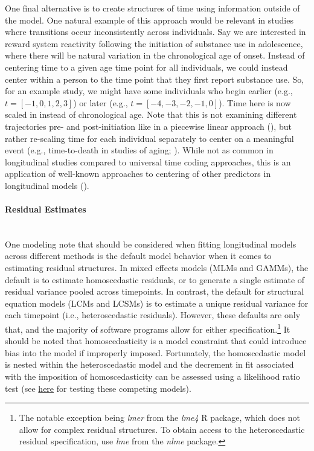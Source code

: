 \documentclass[11pt]{article}
\newcommand{\subsubsubsection}[1]{\paragraph{#1}\mbox{}\\}  %
\begin{document}
One final alternative is to create structures of time using information outside of the model. One natural example of this approach would be relevant in studies where transitions occur inconsistently across individuals. Say we are interested in reward system reactivity following the initiation of substance use in adolescence, where there will be natural variation in the chronological age of onset. Instead of centering time to a given age time point for all individuals, we could instead center within a person to the time point that they first report substance use. So, for an example study, we might have some individuals who begin earlier (e.g., $t = [-1, 0, 1, 2, 3]$) or later (e.g., $t = [-4, -3, -2, -1, 0]$). Time here is now scaled in  instead of chronological age. Note that this is not examining different trajectories pre- and post-initiation like in a piecewise linear approach (\cite{flora_specifying_2008}), but rather re-scaling time for each individual separately to center on a meaningful event (e.g., time-to-death in studies of aging; \cite{kurland_longitudinal_2009}). While not as common in longitudinal studies compared to universal time coding approaches, this is an application of well-known approaches to centering of other predictors in longitudinal models (\cite{biesanz_role_2004,curran_disaggregation_2011}).

\subsubsubsection{Residual Estimates}
One modeling note that should be considered when fitting longitudinal models across different methods is the default model behavior when it comes to estimating residual structures. In mixed effects models (MLMs and GAMMs), the default is to estimate homoscedastic residuals, or to generate a single estimate of residual variance pooled across timepoints. In contrast, the default for structural equation models (LCMs and LCSMs) is to estimate a unique residual variance for each timepoint (i.e., heteroscedastic residuals). However, these defaults are only that, and the majority of software programs allow for either specification.\footnote{The notable exception being \textit{lmer} from the \textit{lme4} R package, which does not allow for complex residual structures. To obtain access to the heteroscedastic residual specification, use \textit{lme} from the \textit{nlme} package.} It should be noted that homoscedasticity is a model constraint that could introduce bias into the model if improperly imposed. Fortunately, the homoscedastic model is nested within the heteroscedastic model and the decrement in fit associated with the imposition of homoscedasticity can be assessed using a likelihood ratio test (see \href{https://e-m-mccormick.github.io/static/longitudinal-primer/03-time.html#residual-estimates}{here} for testing these competing models).
\end{document}
